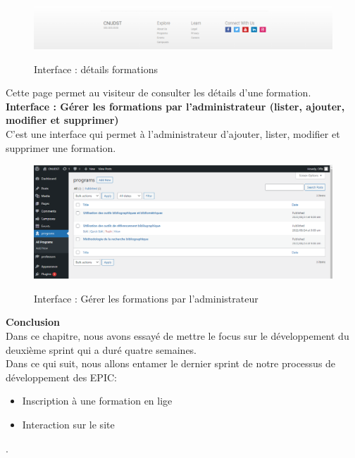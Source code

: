 \begin{itemize}
\begin{figure}[!h]
		{\includegraphics[width=1.05\textwidth]{D) IMAGES/detfor3.png}}
		\caption{Interface : détails formations}
		\label{Org}
	\end{figure}
	Cette page permet au visiteur de consulter les détails d'une formation. \\
	\textbf{Interface : Gérer les formations par l'administrateur (lister, ajouter, modifier et supprimer)}\\
	C'est une interface qui permet à l'administrateur d'ajouter, lister, modifier et supprimer une formation.
	\newpage 
	\begin{figure}[!h]
		\centering
		{\includegraphics[width=1.05\textwidth]{D) IMAGES/Gerer.png}}
		\caption{Interface : Gérer les formations par l'administrateur }
		\label{Org}
	\end{figure}
\end{itemize}
\textbf{Conclusion}\\
Dans ce chapitre, nous avons essayé de mettre le focus sur le développement du deuxième sprint qui a duré quatre semaines.\\
Dans ce qui suit, nous allons entamer le dernier sprint de notre processus de développement des EPIC: \begin{itemize}
	\item Inscription à une formation en lige
	\item Interaction sur le site
\end{itemize}.





